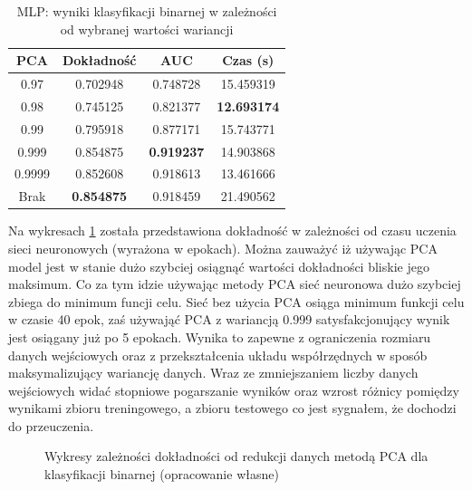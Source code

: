 \documentclass[a4paper, twoside, 11pt, openright]{article}
\begin{document}
\begin{table}[H]
    \centering
    \begin{tabular}{|c|c|c|c|}
    \hline
        \textbf{PCA} & \textbf{Dokładność} &  \textbf{AUC} &  \textbf{Czas (s)} \\ \hline
0.97               &  0.702948 &  0.748728 &   15.459319 \\ \hline
0.98               &  0.745125 &  0.821377 &   \textbf{12.693174} \\ \hline
0.99               &  0.795918 &  0.877171 &   15.743771 \\ \hline
0.999           &  0.854875 &  \textbf{0.919237} &   14.903868 \\ \hline
0.9999             &  0.852608 &  0.918613 &   13.461666 \\ \hline
Brak                &  \textbf{0.854875} &  0.918459 &   21.490562 \\ \hline

    \end{tabular}
    \caption{MLP: wyniki klasyfikacji binarnej w zależności od wybranej wartości wariancji}
    \label{tab:nn_pca_binary}
\end{table}

Na wykresach \ref{img:nn_pca_binary_vs_accuracy} została przedstawiona dokładność w zależności od czasu uczenia sieci neuronowych (wyrażona w epokach). Można zauważyć iż używając PCA model jest w stanie dużo szybciej osiągnąć wartości dokładności bliskie jego maksimum. Co za tym idzie używając metody PCA sieć neuronowa dużo szybciej zbiega do minimum funcji celu. Sieć bez użycia PCA osiąga minimum funkcji celu w czasie 40 epok, zaś używająć PCA z wariancją 0.999 satysfakcjonujący wynik jest osiągany już po 5 epokach. Wynika to zapewne z ograniczenia rozmiaru danych wejściowych oraz z przekształcenia układu współrzędnych w sposób maksymalizujący wariancję danych. Wraz ze zmniejszaniem liczby danych wejściowych widać stopniowe pogarszanie wyników oraz wzrost różnicy pomiędzy wynikami zbioru treningowego, a zbioru testowego co jest sygnałem, że dochodzi do przeuczenia.


\begin{figure}[H]%
\centering
{}%
\qquad
{}%
\qquad
{}%
\qquad
{}%

\caption{Wykresy zależności dokładności od redukcji danych metodą PCA dla klasyfikacji binarnej (opracowanie własne)}
\label{img:nn_pca_binary_vs_accuracy}
\end{figure}
\end{document}
